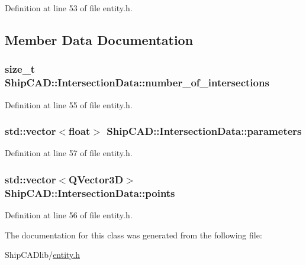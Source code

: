 Definition at line 53 of file entity.\-h.



\subsection{Member Data Documentation}
\hypertarget{classShipCAD_1_1IntersectionData_a5b42e3b8b81d18963f9a07609b402628}{
\subsubsection[{number\-\_\-of\-\_\-intersections}]{\setlength{\rightskip}{0pt plus 5cm}size\-\_\-t Ship\-C\-A\-D\-::\-Intersection\-Data\-::number\-\_\-of\-\_\-intersections}}\label{classShipCAD_1_1IntersectionData_a5b42e3b8b81d18963f9a07609b402628}


Definition at line 55 of file entity.\-h.

\hypertarget{classShipCAD_1_1IntersectionData_a06fcbb71243644bdea0e5b86da3b191c}{
\subsubsection[{parameters}]{\setlength{\rightskip}{0pt plus 5cm}std\-::vector$<$float$>$ Ship\-C\-A\-D\-::\-Intersection\-Data\-::parameters}}\label{classShipCAD_1_1IntersectionData_a06fcbb71243644bdea0e5b86da3b191c}


Definition at line 57 of file entity.\-h.

\hypertarget{classShipCAD_1_1IntersectionData_a926e126e42d95e01b39e2750a0e1fb95}{
\subsubsection[{points}]{\setlength{\rightskip}{0pt plus 5cm}std\-::vector$<$Q\-Vector3\-D$>$ Ship\-C\-A\-D\-::\-Intersection\-Data\-::points}}\label{classShipCAD_1_1IntersectionData_a926e126e42d95e01b39e2750a0e1fb95}


Definition at line 56 of file entity.\-h.



The documentation for this class was generated from the following file\-:\begin{DoxyCompactItemize}
\item 
Ship\-C\-A\-Dlib/\hyperlink{entity_8h}{entity.\-h}\end{DoxyCompactItemize}
